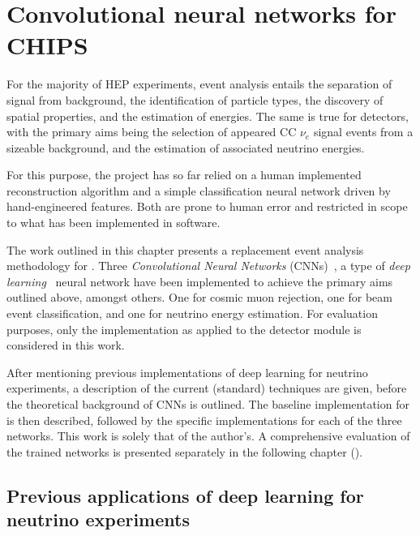 \chapter{Convolutional neural networks for CHIPS} %
\label{chap:cnn} %

For the majority of HEP experiments, event analysis entails the separation of signal from
background, the identification of particle types, the discovery of spatial properties, and the
estimation of energies. The same is true for \chips detectors, with the primary aims being the
selection of appeared CC $\nu_{e}$ signal events from a sizeable background, and the estimation of
associated neutrino energies.

For this purpose, the \chips project has so far relied on a human implemented reconstruction
algorithm and a simple classification neural network driven by hand-engineered features. Both are
prone to human error and restricted in scope to what has been implemented in software.

The work outlined in this chapter presents a replacement event analysis methodology for \chips.
Three \emph{Convolutional Neural Networks} (CNNs)~\cite{fukushima1982}, a type of \emph{deep
learning}~\cite{goodfellow2016} neural network have been implemented to achieve the primary aims
outlined above, amongst others. One for cosmic muon rejection, one for beam event classification,
and one for neutrino energy estimation. For evaluation purposes, only the implementation as
applied to the \chipsfive detector module is considered in this work.

After mentioning previous implementations of deep learning for neutrino experiments, a description
of the current (standard) techniques are given, before the theoretical background of CNNs is
outlined. The baseline implementation for \chips is then described, followed by the specific
implementations for each of the three networks. This work is solely that of the author's. A
comprehensive evaluation of the trained networks is presented separately in the following chapter
().

\section{Previous applications of deep learning for neutrino experiments} %
\label{sec:cnn_previous} %

